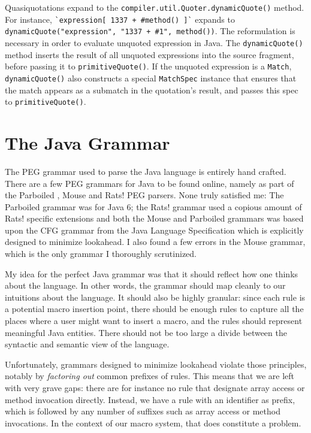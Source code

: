 Quasiquotations expand to the \texttt{compiler.util.Quoter.dynamicQuote()}
method. For instance, \lstinline{`expression[ 1337 + #method() ]`} expands to
\lstinline{dynamicQuote("expression", "1337 + #1", method())}. The reformulation
is necessary in order to evaluate unquoted expression in Java. The
\texttt{dynamicQuote()} method inserts the result of all unquoted expressions
into the source fragment, before passing it to \texttt{primitiveQuote()}. If the
unquoted expression is a \texttt{Match}, \texttt{dynamicQuote()} also constructs
a special \texttt{MatchSpec} instance that ensures that the match appears as a
submatch in the quotation's result, and passes this spec to
\texttt{primitiveQuote()}.

\section{The Java Grammar}
\label{our_java_grammar}

The PEG grammar used to parse the Java language is entirely hand crafted. There
are a few PEG grammars for Java to be found online, namely as part of the
Parboiled \cite{parboiled}, Mouse \cite{redziejowski2009} and Rats!
\cite{grimm2006} PEG parsers. None truly satisfied me: The Parboiled grammar was
for Java 6; the Rats! grammar used a copious amount of Rats! specific extensions
and both the Mouse and Parboiled grammars was based upon the CFG grammar from
the Java Language Specification \cite{jls} which is explicitly designed to
minimize lookahead. I also found a few errors in the Mouse grammar, which is the
only grammar I thoroughly scrutinized.

My idea for the perfect Java grammar was that it should reflect how one thinks
about the language. In other words, the grammar should map cleanly to our
intuitions about the language. It should also be highly granular: since each
rule is a potential macro insertion point, there should be enough rules to
capture all the places where a user might want to insert a macro, and the rules
should represent meaningful Java entities. There should not be too large a
divide between the syntactic and semantic view of the language.

Unfortunately, grammars designed to minimize lookahead violate those principles,
notably by \emph{factoring out} common prefixes of rules. This means that we are
left with very grave gaps: there are for instance no rule that designate array
access or method invocation directly. Instead, we have a rule with an identifier
as prefix, which is followed by any number of suffixes such as array access or
method invocations. In the context of our macro system, that does constitute a
problem.

